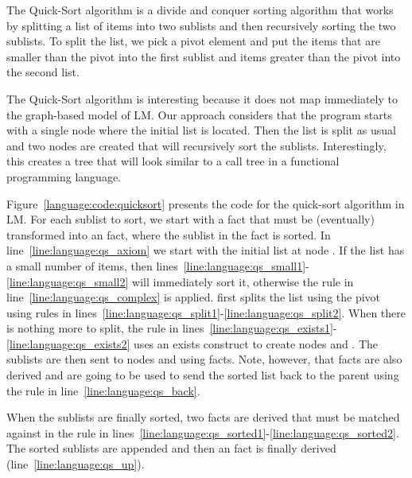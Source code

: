 The Quick-Sort algorithm is a divide and conquer sorting algorithm that works by
splitting a list of items into two sublists and then recursively sorting the two
sublists. To split the list, we pick a pivot element and put the items that are
smaller than the pivot into the first sublist and items greater than the pivot
into the second list.

The Quick-Sort algorithm is interesting because it does not map immediately to
the graph-based model of LM. Our approach considers that the program starts with
a single node where the initial list is located. Then the list is split as usual
and two nodes are created that will recursively sort the sublists.
Interestingly, this creates a tree that will look similar to a call tree in a
functional programming language.

Figure~\ref{language:code:quicksort} presents the code for the quick-sort
algorithm in LM. For each sublist to sort, we start with a  fact that
must be (eventually) transformed into an  fact, where the sublist in
the  fact is sorted.  In line~\ref{line:language:qs_axiom} we start
with the initial list at node . If the list has a small number of
items, then lines~\ref{line:language:qs_small1}-\ref{line:language:qs_small2}
will immediately sort it, otherwise the rule in
line~\ref{line:language:qs_complex} is applied.   first splits the
list using the pivot  using rules in
lines~\ref{line:language:qs_split1}-\ref{line:language:qs_split2}.  When there
is nothing more to split, the rule in
lines~\ref{line:language:qs_exists1}-\ref{line:language:qs_exists2} uses an
exists construct to create nodes  and . The sublists are then
sent to nodes  and  using  facts.  Note, however,
that  facts are also derived and are going to be used to send the
sorted list back to the parent using the rule in
line~\ref{line:language:qs_back}.

When the sublists are finally sorted, two  facts are derived that
must be matched against  in the rule in
lines~\ref{line:language:qs_sorted1}-\ref{line:language:qs_sorted2}. The sorted
sublists are appended and then an  fact is finally derived
(line~\ref{line:language:qs_up}).

